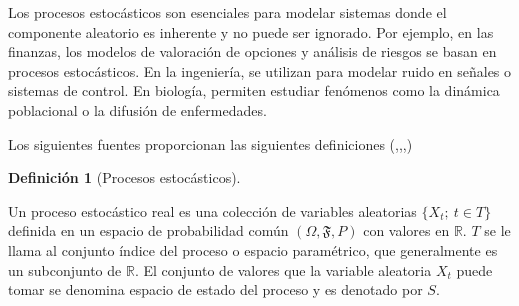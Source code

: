 \documentclass[
  us-letterpaper,
]{scrreprt}
\theoremstyle{plain}
\theoremstyle{plain}
\theoremstyle{definition}
\newtheorem{definition}{Definición}[chapter]
\theoremstyle{remark}
\begin{document}
Los procesos estocásticos son esenciales para modelar sistemas donde el
componente aleatorio es inherente y no puede ser ignorado. Por ejemplo,
en las finanzas, los modelos de valoración de opciones y análisis de
riesgos se basan en procesos estocásticos. En la ingeniería, se utilizan
para modelar ruido en señales o sistemas de control. En biología,
permiten estudiar fenómenos como la dinámica poblacional o la difusión
de enfermedades.

Los siguientes fuentes proporcionan las siguientes definiciones
(\autocite{castaneda2012introduction},\autocite{dobrow2016introduction},\autocite{rincon2012introduccion},\autocite{ross1995stochastic})

\begin{definition}[Procesos
estocásticos]\protect\hypertarget{def-proc_esto}{}\label{def-proc_esto}

Un proceso estocástico real es una colección de variables aleatorias
\(\{X_t;\  t\in T\}\) definida en un espacio de probabilidad común
\((\Omega, \mathfrak{F}, P)\) con valores en \(\mathbb{R}\). \(T\) se le
llama al conjunto índice del proceso o espacio paramétrico, que
generalmente es un subconjunto de \(\mathbb R\). El conjunto de valores
que la variable aleatoria \(X_t\) puede tomar se denomina espacio de
estado del proceso y es denotado por \(S\).

\end{definition}
\end{document}
